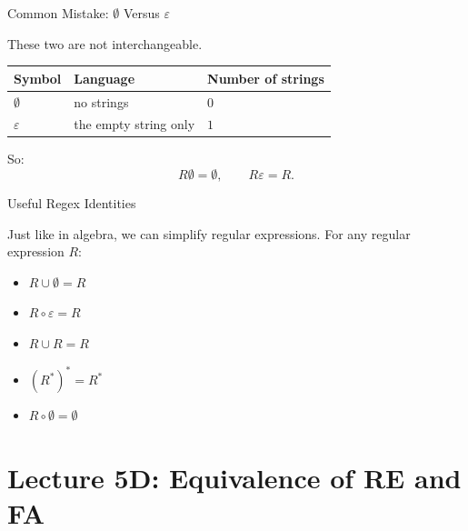 \documentclass[10pt,aspectratio=169]{beamer}
\newcommand{\eps}{\varepsilon}
\begin{document}
\begin{frame}{Common Mistake: $\emptyset$ Versus $\eps$}

These two are not interchangeable.

\vspace{0.7em}
\begin{table}
\centering
\begin{tabular}{lll}
\toprule
\textbf{Symbol} & \textbf{Language} & \textbf{Number of strings} \\
\midrule
$\emptyset$ & no strings & $0$ \\
$\eps$ & the empty string only & $1$ \\
\bottomrule
\end{tabular}
\end{table}

\vspace{0.7em}
So:
\[
R\emptyset=\emptyset,\qquad R\eps=R.
\]

\end{frame}

\begin{frame}{Useful Regex Identities}

Just like in algebra, we can simplify regular expressions. For any regular expression $R$:

\vspace{1em}

\begin{itemize}
    \item $R \cup \emptyset = R$
    \item $R \circ \eps = R$
    \item $R \cup R = R$
    \item $(R^*)^* = R^*$
    \item $R \circ \emptyset = \emptyset$
\end{itemize}

\end{frame}

\section{Lecture 5D: Equivalence of RE and FA}
\end{document}
